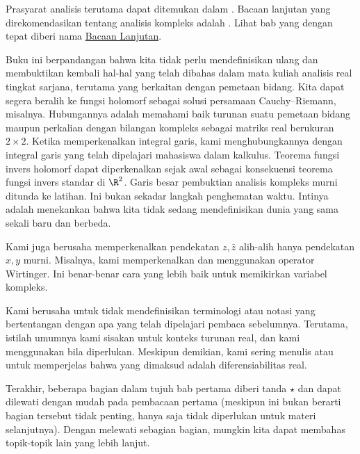 Prasyarat analisis terutama dapat ditemukan dalam
\cites{ra:book,ra:book2,Rudin:principles}.
Bacaan lanjutan yang direkomendasikan tentang analisis kompleks adalah
\cites{Boas,Conway1,Conway2,Rudin,Ullrich}.
Lihat bab yang dengan tepat diberi nama
\hyperref[ch:furtherreading]{Bacaan Lanjutan}.

Buku ini berpandangan bahwa kita tidak perlu mendefinisikan ulang dan
membuktikan kembali hal-hal yang telah dibahas dalam mata kuliah analisis real
tingkat sarjana, terutama yang berkaitan dengan pemetaan bidang.
Kita dapat segera beralih ke fungsi holomorf sebagai solusi persamaan
Cauchy--Riemann, misalnya.
Hubungannya adalah memahami baik turunan suatu pemetaan bidang maupun
perkalian dengan bilangan kompleks sebagai matriks real berukuran $2 \times 2$.
Ketika memperkenalkan integral garis, kami menghubungkannya dengan integral
garis yang telah dipelajari mahasiswa dalam kalkulus.
Teorema fungsi invers holomorf dapat diperkenalkan sejak awal sebagai
konsekuensi teorema fungsi invers standar di $\R^2$.
Garis besar pembuktian analisis kompleks murni ditunda ke latihan.
Ini bukan sekadar langkah penghematan waktu.
Intinya adalah menekankan bahwa kita tidak sedang mendefinisikan dunia yang
sama sekali baru dan berbeda.

Kami juga berusaha memperkenalkan pendekatan $z,\bar{z}$ alih-alih hanya
pendekatan $x,y$ murni.
Misalnya, kami memperkenalkan dan menggunakan operator Wirtinger.
Ini benar-benar cara yang lebih baik untuk memikirkan variabel kompleks.

Kami berusaha untuk tidak mendefinisikan terminologi atau notasi yang
bertentangan dengan apa yang telah dipelajari pembaca sebelumnya.
Terutama, istilah  umumnya kami sisakan untuk konteks
turunan real, dan kami menggunakan  bila
diperlukan.
Meskipun demikian, kami sering menulis  atau
 untuk memperjelas bahwa yang
dimaksud adalah diferensiabilitas real.

Terakhir, beberapa bagian dalam tujuh bab pertama diberi tanda $\star$ dan
dapat dilewati dengan mudah pada pembacaan pertama (meskipun ini bukan berarti
bagian tersebut tidak penting, hanya saja tidak diperlukan untuk materi
selanjutnya).
Dengan melewati sebagian bagian, mungkin kita dapat membahas topik-topik lain
yang lebih lanjut.

\medskip

